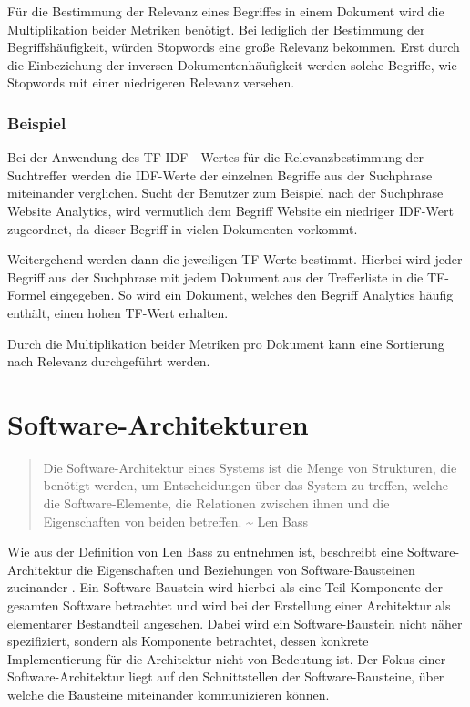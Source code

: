 Für die Bestimmung der Relevanz eines Begriffes in einem Dokument wird die Multiplikation beider Metriken benötigt. Bei lediglich der Bestimmung der Begriffshäufigkeit, würden Stopwords eine große Relevanz bekommen. Erst durch die Einbeziehung der inversen Dokumentenhäufigkeit werden solche Begriffe, wie Stopwords mit einer niedrigeren Relevanz versehen.

\subsubsection{Beispiel}

Bei der Anwendung des TF-IDF - Wertes für die Relevanzbestimmung der Suchtreffer werden die IDF-Werte der einzelnen Begriffe aus der Suchphrase miteinander verglichen. Sucht der Benutzer zum Beispiel nach der Suchphrase \glqq Website Analytics\grqq{}, wird vermutlich dem Begriff \glqq Website\grqq{} ein niedriger IDF-Wert zugeordnet, da dieser Begriff in vielen Dokumenten vorkommt.

Weitergehend werden dann die jeweiligen TF-Werte bestimmt. Hierbei wird jeder Begriff aus der Suchphrase mit jedem Dokument aus der Trefferliste in die TF-Formel eingegeben. So wird ein Dokument, welches den Begriff \glqq Analytics\grqq{} häufig enthält, einen hohen TF-Wert erhalten.

Durch die Multiplikation beider Metriken pro Dokument kann eine Sortierung nach Relevanz durchgeführt werden.

\section{Software-Architekturen\label{sec2.2:Unterpunkt-2}}

\begin{quote}
    \glqq Die Software-Architektur eines Systems ist die Menge von Strukturen, die benötigt werden, um Entscheidungen über das System zu treffen, welche die Software-Elemente, die Relationen zwischen ihnen und die Eigenschaften von beiden betreffen.\grqq{} \textasciitilde{} Len Bass \cite[S. 4]{Bass.2013}
\end{quote}

Wie aus der Definition von Len Bass zu entnehmen ist, beschreibt eine Software-Architektur die Eigenschaften und Beziehungen von Software-Bausteinen zueinander \cite[S. 4]{Bass.2013}. Ein Software-Baustein wird hierbei als eine Teil-Komponente der gesamten Software betrachtet und wird bei der Erstellung einer Architektur als elementarer Bestandteil angesehen. Dabei wird ein Software-Baustein nicht näher spezifiziert, sondern als Komponente betrachtet, dessen konkrete Implementierung für die Architektur nicht von Bedeutung ist. Der Fokus einer Software-Architektur liegt auf den Schnittstellen der Software-Bausteine, über welche die Bausteine miteinander kommunizieren können.

